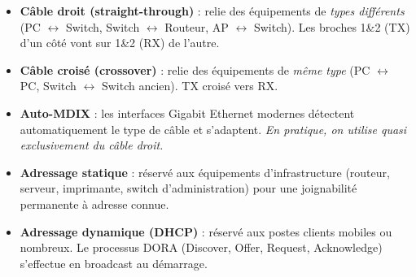 \documentclass[11pt]{article}
\newcommand{\cle}[1]{{\popxbold\color{popdark}#1}}
\begin{document}
\begin{propriete}
\begin{itemize}
\item \textbf{Câble droit (straight-through)} : relie des équipements de \emph{types différents} (PC $\leftrightarrow$ Switch, Switch $\leftrightarrow$ Routeur, AP $\leftrightarrow$ Switch). Les broches 1\&2 (TX) d'un côté vont sur 1\&2 (RX) de l'autre.
\item \textbf{Câble croisé (crossover)} : relie des équipements de \emph{même type} (PC $\leftrightarrow$ PC, Switch $\leftrightarrow$ Switch ancien). TX croisé vers RX.
\item \textbf{Auto-MDIX} : les interfaces Gigabit Ethernet modernes détectent automatiquement le type de câble et s'adaptent. \emph{En pratique, on utilise quasi exclusivement du câble droit.}
\item \textbf{Adressage statique} : réservé aux équipements d'infrastructure (routeur, serveur, imprimante, switch d'administration) pour une joignabilité permanente à adresse connue.
\item \textbf{Adressage dynamique (DHCP)} : réservé aux postes clients mobiles ou nombreux. Le processus \cle{DORA} (Discover, Offer, Request, Acknowledge) s'effectue en broadcast au démarrage.
\end{itemize}
\end{propriete}
\end{document}
